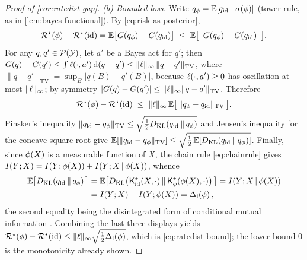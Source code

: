 \begin{proof}[Proof of \cref{cor:ratedist-gap}]
\emph{(b) Bounded loss.} Write $q_{\phi}=\mathbb{E}[q_{\mathrm{id}}\mid
\sigma\!\left(\phi\right)]$ (tower rule, as in \cref{lem:bayes-functional}). By
\eqref{eq:risk-as-posterior},
\[
  \mathcal{R}^{\star}(\phi)-\mathcal{R}^{\star}(\mathrm{id})
  = \mathbb{E}\big[G(q_{\phi})-G(q_{\mathrm{id}})\big]
  \;\le\; \mathbb{E}\big[\,\big|G(q_{\phi})-G(q_{\mathrm{id}})\big|\,\big].
\]
For any $q,q'\in\mathcal{P}(\mathcal{Y})$, let $a'$ be a Bayes act for $q'$; then
$G(q)-G(q')\le\int\ell(\cdot,a')\,\mathrm{d}(q-q')\le\|\ell\|_\infty
\,\|q-q'\|_{\mathrm{TV}}$, where $\|q-q'\|_{\mathrm{TV}}=\sup_{B}|q(B)-q'(B)|$,
because $\ell(\cdot,a')\ge0$ has oscillation at most $\|\ell\|_\infty$; by
symmetry $|G(q)-G(q')|\le\|\ell\|_\infty\|q-q'\|_{\mathrm{TV}}$. Therefore
\[
  \mathcal{R}^{\star}(\phi)-\mathcal{R}^{\star}(\mathrm{id})
  \;\le\; \|\ell\|_\infty\,\mathbb{E}\big[\,\|q_{\phi}-q_{\mathrm{id}}\|_{\mathrm{TV}}\,\big].
\]
Pinsker's inequality
$\|q_{\mathrm{id}}-q_{\phi}\|_{\mathrm{TV}}\le\sqrt{\tfrac12D_{\mathrm{KL}}\!\left(q_{\mathrm{id}} \,\Vert\, q_{\phi}\right)}$
and Jensen's inequality for the concave square root give
$\mathbb{E}[\|q_{\mathrm{id}}-q_{\phi}\|_{\mathrm{TV}}]\le
\sqrt{\tfrac12\,\mathbb{E}[D_{\mathrm{KL}}\!\left(q_{\mathrm{id}} \,\Vert\, q_{\phi}\right)]}$. Finally, since
$\phi(X)$ is a measurable function of $X$, the chain rule \eqref{eq:chainrule}
gives $I(Y ; X)=I(Y ; \phi(X))+I(Y ; X\,\vert\,\phi(X))$, whence
\begin{align*}
  \mathbb{E}\big[D_{\mathrm{KL}}\!\left(q_{\mathrm{id}} \,\Vert\, q_{\phi}\right)\big]
  &= \mathbb{E}\big[D_{\mathrm{KL}}\!\left(\mathsf{K}^{\star}_{\mathrm{id}}(X,\cdot) \,\Vert\, \mathsf{K}^{\star}_{\phi}(\phi(X),\cdot)\right)\big]
   = I(Y ; X\,\vert\,\phi(X)) \\
  &= I(Y ; X)-I(Y ; \phi(X))
   = \Delta_{\mathsf{I}}\!\left(\phi\right),
\end{align*}
the second equality being the disintegrated form of conditional mutual
information \citep[Thm.~2.5.2 and eq.~(2.61)]{coverthomas2006}. Combining the
last three displays yields
$\mathcal{R}^{\star}(\phi)-\mathcal{R}^{\star}(\mathrm{id})\le\|\ell\|_\infty\sqrt{\tfrac12\Delta_{\mathsf{I}}\!\left(\phi\right)}$,
which is \eqref{eq:ratedist-bound}; the lower bound $0$ is the monotonicity
already shown.
\end{proof}

